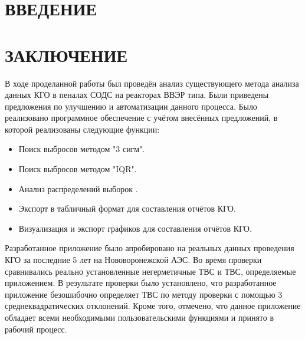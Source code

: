 \documentclass[a4paper,12pt]{article}
\begin{document}
\section*{\centering ВВЕДЕНИЕ}
\pagebreak

%
\pagebreak
\pagebreak
\pagebreak
\pagebreak
\pagebreak




\section*{\centering ЗАКЛЮЧЕНИЕ}

В ходе проделанной работы был проведён анализ существующего метода анализа данных КГО в пеналах СОДС на реакторах ВВЭР типа. Были приведены предложения по улучшению и автоматизации данного процесса. Было реализовано программное обеспечение с учётом внесённых предложений, в которой реализованы следующие функции:

\begin{itemize}
\item Поиск выбросов методом "3 сигм".
\item Поиск выбросов методом "IQR".
\item Анализ распределений выборок .
\item Экспорт в табличный формат для составления отчётов КГО.
\item Визуализация и экспорт графиков для составления отчётов КГО.
\end{itemize}

Разработанное приложение было апробировано на реальных данных проведения КГО за последние 5 лет на Нововоронежской АЭС. Во время проверки сравнивались реально установленные негерметичные ТВС и ТВС, определяемые приложением. В результате проверки было установлено, что разработанное приложение безошибочно определяет ТВС по методу проверки с помощью 3 среднеквадратических отклонений.
Кроме того, отмечено, что данное приложение обладает всеми необходимыми пользовательскими функциями и принято в рабочий процесс.
\end{document}
